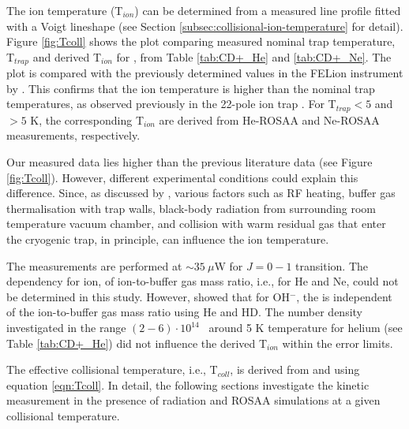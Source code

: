 The ion temperature (T$_{ion}$) can be determined from a measured line profile
fitted with a Voigt lineshape (see Section
\ref{subsec:collisional-ion-temperature} for detail). Figure \ref{fig:Tcoll}
shows the plot comparing measured nominal trap temperature, T$_{trap}$ and
derived T$_{ion}$ for \CD, from Table \ref{tab:CD+_He} and \ref{tab:CD+_Ne}.
The plot is compared with the previously determined values in the FELion
instrument by \citet{kluge_state-selective_2016}. This confirms that the ion
temperature is higher than the nominal trap temperatures, as observed
previously in the 22-pole ion trap \cite{asvany_numerical_2009,
    otto_internal_2013, endres_incomplete_2017}. For T$_{trap} < 5$ and $>5$ K, the
corresponding T$_{ion}$ are derived from He-ROSAA and Ne-ROSAA measurements,
respectively.


Our measured \Tion data lies higher than the previous literature data (see Figure \ref{fig:Tcoll}). However, different experimental conditions could explain this difference. Since, as discussed by \citet{endres_incomplete_2017}, various factors such as RF heating, buffer gas thermalisation with trap walls, black-body radiation from surrounding room temperature vacuum chamber, and collision with warm residual gas that enter the cryogenic trap, in principle, can influence the ion temperature.

The measurements are performed at $\sim 35\ \mu$W for \CD $J=0-1$ transition.
The \Tion dependency for \CD ion, of ion-to-buffer gas mass ratio, i.e., for He
and Ne, could not be determined in this study. However,
\citet{endres_incomplete_2017} showed that for OH$^-$, the \Tion is independent
of the ion-to-buffer gas mass ratio using He and HD. The number density
investigated in the range $(2-6) \cdot 10^{14}$ \percc\ around 5 K temperature
for helium (see Table \ref{tab:CD+_He}) did not influence the derived T$_{ion}$
within the error limits.

The effective collisional temperature, i.e., T$_{coll}$, is derived from \Ttrap
and \Tion using equation \ref{eqn:Tcoll}. In detail, the following sections
investigate the kinetic measurement in the presence of radiation and ROSAA
simulations at a given collisional temperature.


